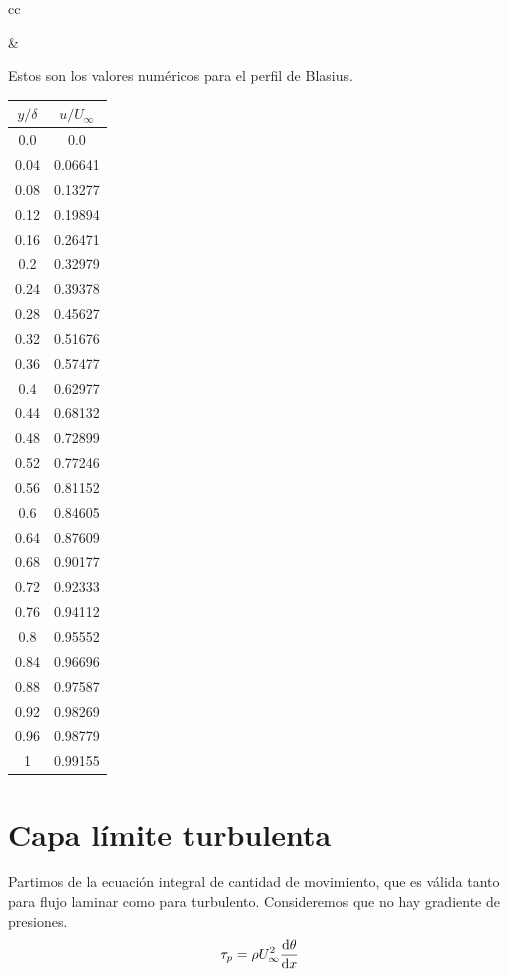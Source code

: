 \begin{tabular}{cc}
\begin{minipage}[c]{0.75\textwidth}
			\begin{flushleft}
				\par\end{flushleft}%
		\end{minipage} & %
		\begin{minipage}[c]{0.25\textwidth}%
			Estos son los valores numéricos para el perfil de Blasius.
				\begin{center}
					\begin{tabular}{|c|c|}
						\hline 
						$y/\delta$  & $u/U_{\infty}$ \tabularnewline
						\hline 
						\hline 
						0.0  & 0.0 \tabularnewline
						\hline 
						0.04  & 0.06641 \tabularnewline
						\hline 
						0.08  & 0.13277 \tabularnewline
						\hline 
						0.12  & 0.19894 \tabularnewline
						\hline 
						0.16  & 0.26471 \tabularnewline
						\hline 
						0.2  & 0.32979 \tabularnewline
						\hline 
						0.24  & 0.39378 \tabularnewline
						\hline 
						0.28  & 0.45627 \tabularnewline
						\hline 
						0.32  & 0.51676 \tabularnewline
						\hline 
						0.36  & 0.57477 \tabularnewline
						\hline 
						0.4  & 0.62977 \tabularnewline
						\hline 
						0.44  & 0.68132 \tabularnewline
						\hline 
						0.48  & 0.72899 \tabularnewline
						\hline 
						0.52  & 0.77246 \tabularnewline
						\hline 
						0.56  & 0.81152 \tabularnewline
						\hline 
						0.6  & 0.84605 \tabularnewline
						\hline 
						0.64  & 0.87609 \tabularnewline
						\hline 
						0.68  & 0.90177 \tabularnewline
						\hline 
						0.72  & 0.92333 \tabularnewline
						\hline 
						0.76  & 0.94112 \tabularnewline
						\hline 
						0.8  & 0.95552 \tabularnewline
						\hline 
						0.84  & 0.96696 \tabularnewline
						\hline 
						0.88  & 0.97587 \tabularnewline
						\hline 
						0.92  & 0.98269 \tabularnewline
						\hline 
						0.96  & 0.98779 \tabularnewline
						\hline 
						1  & 0.99155 \tabularnewline
						\hline 
					\end{tabular}
					\par\end{center}
		\end{minipage}\tabularnewline
	\end{tabular}

\section{Capa límite turbulenta}

	
	Partimos de la ecuación integral de cantidad de movimiento, que es
	válida tanto para flujo laminar como para turbulento. Consideremos
	que no hay gradiente de presiones. 
	\[
	\tau_{p}=\rho U_{\infty}^{2}\frac{\textrm{d} \theta}{\textrm{d} x}
	\]
	
